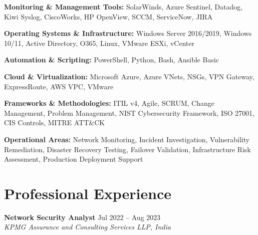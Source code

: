 \documentclass[11pt,a4paper]{article}
\begin{document}
\textbf{Monitoring \& Management Tools:}
SolarWinds, Azure Sentinel, Datadog, Kiwi Syslog, CiscoWorks, HP OpenView, SCCM, ServiceNow, JIRA

\textbf{Operating Systems \& Infrastructure:}
Windows Server 2016/2019, Windows 10/11, Active Directory, O365, Linux, VMware ESXi, vCenter

\textbf{Automation \& Scripting:}
PowerShell, Python, Bash, Ansible Basic

\textbf{Cloud \& Virtualization:}
Microsoft Azure, Azure VNets, NSGs, VPN Gateway, ExpressRoute, AWS VPC, VMware

\textbf{Frameworks \& Methodologies:}
ITIL v4, Agile, SCRUM, Change Management, Problem Management, NIST Cybersecurity Framework, ISO 27001, CIS Controls, MITRE ATT\&CK

\textbf{Operational Areas:}
Network Monitoring, Incident Investigation, Vulnerability Remediation, Disaster Recovery Testing, Failover Validation, Infrastructure Risk Assessment, Production Deployment Support

\section*{Professional Experience}

\textbf{Network Security Analyst} \hfill Jul 2022 -- Aug 2023\\
\textit{KPMG Assurance and Consulting Services LLP, India}
\end{document}
